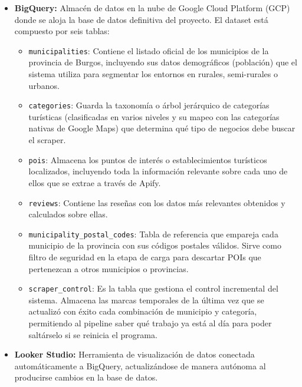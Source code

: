 \begin{itemize}
\begin{itemize}
        Para todos los campos, se puede utilizar varios símbolos que permiten personalizar al detalle el tipo de automatización que queremos para el proyecto: El asterisco (\texttt{*}) significa «todos» (ej. todos los días de la semana); la coma (\texttt{,}) sirve para listar valores (ej. \texttt{1,3,5} para lunes, miércoles y viernes); el guion (\texttt{-}) define rangos (ej. \texttt{1-5} de lunes a viernes); y la barra (\texttt{/}) indica intervalos de repetición (ej. \texttt{*/2} para ejecutarse cada dos horas).
    \end{itemize}
    \item \textbf{BigQuery:} Almacén de datos en la nube de Google Cloud Platform (GCP) donde se aloja la base de datos definitiva del proyecto. 
    El dataset está compuesto por seis tablas:
    \begin{itemize}
        \item \texttt{municipalities}: Contiene el listado oficial de los municipios de la provincia de Burgos, incluyendo sus datos demográficos (población) que el sistema utiliza para segmentar los entornos en rurales, semi-rurales o urbanos.
        \item \texttt{categories}: Guarda la taxonomía o árbol jerárquico de categorías turísticas (clasificadas en varios niveles y su mapeo con las categorías nativas de Google Maps) que determina qué tipo de negocios debe buscar el scraper.
        \item \texttt{pois}: Almacena los puntos de interés o establecimientos turísticos localizados, incluyendo toda la información relevante sobre cada uno de ellos que se extrae a través de Apify.
        \item \texttt{reviews}: Contiene las reseñas con los datos más relevantes obtenidos y calculados sobre ellas.
        \item \texttt{municipality\_postal\_codes}: Tabla de referencia que empareja cada municipio de la provincia con sus códigos postales válidos. Sirve como filtro de seguridad en la etapa de carga para descartar POIs que pertenezcan a otros municipios o provincias.
        \item \texttt{scraper\_control}: Es la tabla que gestiona el control incremental del sistema. Almacena las marcas temporales de la última vez que se actualizó con éxito cada combinación de municipio y categoría, permitiendo al pipeline saber qué trabajo ya está al día para poder saltárselo si se reinicia el programa.
    \end{itemize}
    \item \textbf{Looker Studio:} Herramienta de visualización de datos conectada automáticamente a BigQuery, actualizándose de manera autónoma al producirse cambios en la base de datos.
\end{itemize}

